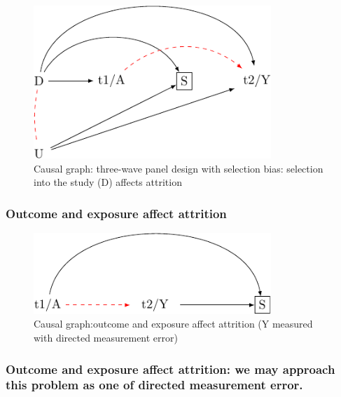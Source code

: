 \documentclass[
  singlecolumn]{report}
\begin{document}
\begin{figure}

{\centering \includegraphics[width=0.8\textwidth,height=\textheight]{causal-dags_files/figure-pdf/fig-dag-8-4-1.pdf}

}

\caption{\label{fig-dag-8-4}Causal graph: three-wave panel design with
selection bias: selection into the study (D) affects attrition}

\end{figure}

\hypertarget{outcome-and-exposure-affect-attrition}{%
\subsubsection{Outcome and exposure affect
attrition}\label{outcome-and-exposure-affect-attrition}}

\begin{figure}

{\centering \includegraphics[width=0.8\textwidth,height=\textheight]{causal-dags_files/figure-pdf/fig-dag-8-5-1.pdf}

}

\caption{\label{fig-dag-8-5}Causal graph:outcome and exposure affect
attrition (Y measured with directed measurement error)}

\end{figure}

\hypertarget{outcome-and-exposure-affect-attrition-we-may-approach-this-problem-as-one-of-directed-measurement-error.}{%
\subsubsection{Outcome and exposure affect attrition: we may approach
this problem as one of directed measurement
error.}\label{outcome-and-exposure-affect-attrition-we-may-approach-this-problem-as-one-of-directed-measurement-error.}}
\end{document}
